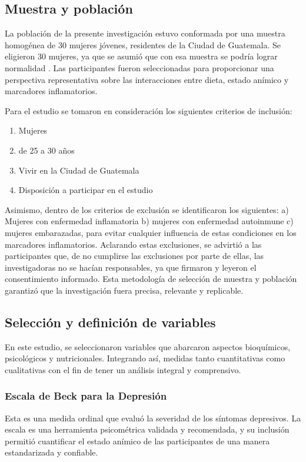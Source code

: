 \documentclass[jou]{apa7}
\begin{document}
	\subsection{Muestra y población}\label{muestra-y-poblaciuxf3n}

	La población de la presente investigación estuvo conformada por una
	muestra homogénea de 30 mujeres jóvenes, residentes de la Ciudad de
	Guatemala. Se eligieron 30 mujeres, ya que se asumió que con esa muestra
	se podría lograr normalidad \parencite{Hernandez2018}. Las
	participantes fueron seleccionadas para proporcionar una perspectiva
	representativa sobre las interacciones entre dieta, estado anímico y
	marcadores inflamatorios.

	Para el estudio se tomaron en consideración los siguientes criterios de
	inclusión:
	\begin{enumerate}
		\item Mujeres
		\item de 25 a 30 años
		\item Vivir en la Ciudad de Guatemala
		\item Disposición a participar en el estudio
	\end{enumerate}


	Asimismo, dentro de los criterios de exclusión se identificaron los
	siguientes: a) Mujeres con enfermedad inflamatoria b) mujeres con
	enfermedad autoinmune c) mujeres embarazadas, para evitar cualquier
	influencia de estas condiciones en los marcadores inflamatorios.
	Aclarando estas exclusiones, se advirtió a las participantes que, de no
	cumplirse las exclusiones por parte de ellas, las investigadoras no se
	hacían responsables, ya que firmaron y leyeron el consentimiento
	informado. Esta metodología de selección de muestra y población
	garantizó que la investigación fuera precisa, relevante y replicable.

	\subsection{Selección y definición de variables}\label{selecciuxf3n-y-definiciuxf3n-de-variables}

	En este estudio, se seleccionaron variables que abarcaron aspectos
	bioquímicos, psicológicos y nutricionales. Integrando así, medidas tanto
	cuantitativas como cualitativas con el fin de tener un análisis integral
	y comprensivo.\\

	\subsubsection{Escala de Beck para la Depresión}
	Esta es una medida ordinal que evaluó la severidad de los síntomas depresivos. La escala es una herramienta psicométrica validada y recomendada, y su inclusión permitió cuantificar el estado anímico de las participantes de una manera estandarizada y confiable.
\end{document}
